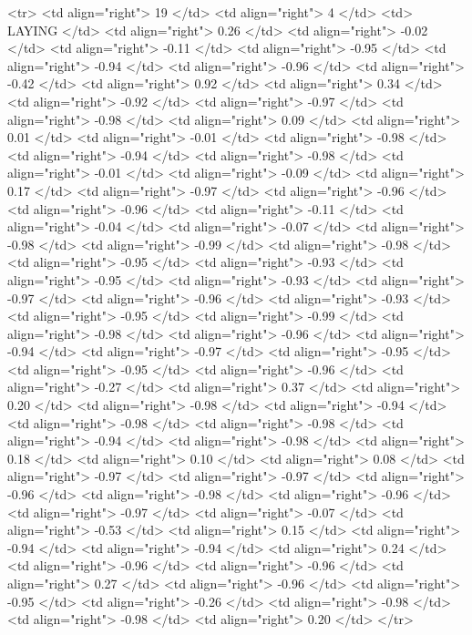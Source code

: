   <tr> <td align="right"> 19 </td> <td align="right">   4 </td> <td> LAYING </td> <td align="right"> 0.26 </td> <td align="right"> -0.02 </td> <td align="right"> -0.11 </td> <td align="right"> -0.95 </td> <td align="right"> -0.94 </td> <td align="right"> -0.96 </td> <td align="right"> -0.42 </td> <td align="right"> 0.92 </td> <td align="right"> 0.34 </td> <td align="right"> -0.92 </td> <td align="right"> -0.97 </td> <td align="right"> -0.98 </td> <td align="right"> 0.09 </td> <td align="right"> 0.01 </td> <td align="right"> -0.01 </td> <td align="right"> -0.98 </td> <td align="right"> -0.94 </td> <td align="right"> -0.98 </td> <td align="right"> -0.01 </td> <td align="right"> -0.09 </td> <td align="right"> 0.17 </td> <td align="right"> -0.97 </td> <td align="right"> -0.96 </td> <td align="right"> -0.96 </td> <td align="right"> -0.11 </td> <td align="right"> -0.04 </td> <td align="right"> -0.07 </td> <td align="right"> -0.98 </td> <td align="right"> -0.99 </td> <td align="right"> -0.98 </td> <td align="right"> -0.95 </td> <td align="right"> -0.93 </td> <td align="right"> -0.95 </td> <td align="right"> -0.93 </td> <td align="right"> -0.97 </td> <td align="right"> -0.96 </td> <td align="right"> -0.93 </td> <td align="right"> -0.95 </td> <td align="right"> -0.99 </td> <td align="right"> -0.98 </td> <td align="right"> -0.96 </td> <td align="right"> -0.94 </td> <td align="right"> -0.97 </td> <td align="right"> -0.95 </td> <td align="right"> -0.95 </td> <td align="right"> -0.96 </td> <td align="right"> -0.27 </td> <td align="right"> 0.37 </td> <td align="right"> 0.20 </td> <td align="right"> -0.98 </td> <td align="right"> -0.94 </td> <td align="right"> -0.98 </td> <td align="right"> -0.98 </td> <td align="right"> -0.94 </td> <td align="right"> -0.98 </td> <td align="right"> 0.18 </td> <td align="right"> 0.10 </td> <td align="right"> 0.08 </td> <td align="right"> -0.97 </td> <td align="right"> -0.97 </td> <td align="right"> -0.96 </td> <td align="right"> -0.98 </td> <td align="right"> -0.96 </td> <td align="right"> -0.97 </td> <td align="right"> -0.07 </td> <td align="right"> -0.53 </td> <td align="right"> 0.15 </td> <td align="right"> -0.94 </td> <td align="right"> -0.94 </td> <td align="right"> 0.24 </td> <td align="right"> -0.96 </td> <td align="right"> -0.96 </td> <td align="right"> 0.27 </td> <td align="right"> -0.96 </td> <td align="right"> -0.95 </td> <td align="right"> -0.26 </td> <td align="right"> -0.98 </td> <td align="right"> -0.98 </td> <td align="right"> 0.20 </td> </tr>
